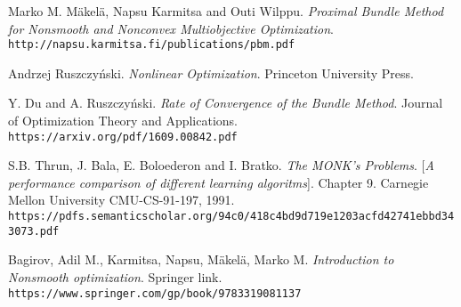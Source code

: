 \begin{thebibliography}{9}
	Marko M. M\"akel\"a, Napsu Karmitsa and Outi Wilppu.
	\textit{Proximal Bundle Method for Nonsmooth and Nonconvex Multiobjective Optimization}.
	\\\texttt{http://napsu.karmitsa.fi/publications/pbm.pdf}
	
	Andrzej Ruszczyński.
	\textit{Nonlinear Optimization}. Princeton University Press. 
	
	Y. Du and A. Ruszczyński.
	\textit{Rate of Convergence of the Bundle Method}. Journal  of  Optimization Theory and Applications.
	\\\texttt{https://arxiv.org/pdf/1609.00842.pdf}


	S.B. Thrun, J. Bala, E. Boloederon and I. Bratko.
	\textit{The MONK's Problems}. 
	[\textit{A performance comparison of different learning algoritms}]. Chapter 9.
	Carnegie Mellon University CMU-CS-91-197, 1991.
	\\\texttt{https://pdfs.semanticscholar.org/94c0/418c4bd9d719e1203acfd42741ebbd343073.pdf}
	
	 Bagirov, Adil M., Karmitsa, Napsu, Mäkelä, Marko M.
	\textit{Introduction to Nonsmooth optimization}. Springer link.
	\\\texttt{https://www.springer.com/gp/book/9783319081137}	

 

	
\end{thebibliography}